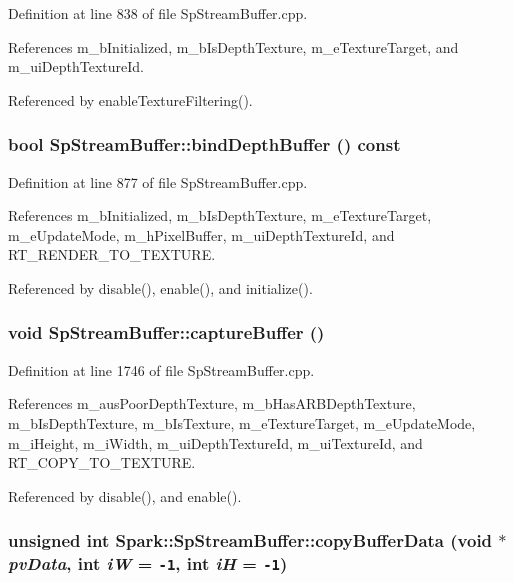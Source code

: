 Definition at line 838 of file Sp\-Stream\-Buffer.cpp.

References m\_\-b\-Initialized, m\_\-b\-Is\-Depth\-Texture, m\_\-e\-Texture\-Target, and m\_\-ui\-Depth\-Texture\-Id.

Referenced by enable\-Texture\-Filtering().
\subsubsection{\setlength{\rightskip}{0pt plus 5cm}bool Sp\-Stream\-Buffer::bind\-Depth\-Buffer () const\hspace{0.3cm}{\tt  [protected]}}\label{classSpark_1_1SpStreamBuffer_b9}


Definition at line 877 of file Sp\-Stream\-Buffer.cpp.

References m\_\-b\-Initialized, m\_\-b\-Is\-Depth\-Texture, m\_\-e\-Texture\-Target, m\_\-e\-Update\-Mode, m\_\-h\-Pixel\-Buffer, m\_\-ui\-Depth\-Texture\-Id, and RT\_\-RENDER\_\-TO\_\-TEXTURE.

Referenced by disable(), enable(), and initialize().
\subsubsection{\setlength{\rightskip}{0pt plus 5cm}void Sp\-Stream\-Buffer::capture\-Buffer ()\hspace{0.3cm}{\tt  [protected]}}\label{classSpark_1_1SpStreamBuffer_b6}


Definition at line 1746 of file Sp\-Stream\-Buffer.cpp.

References m\_\-aus\-Poor\-Depth\-Texture, m\_\-b\-Has\-ARBDepth\-Texture, m\_\-b\-Is\-Depth\-Texture, m\_\-b\-Is\-Texture, m\_\-e\-Texture\-Target, m\_\-e\-Update\-Mode, m\_\-i\-Height, m\_\-i\-Width, m\_\-ui\-Depth\-Texture\-Id, m\_\-ui\-Texture\-Id, and RT\_\-COPY\_\-TO\_\-TEXTURE.

Referenced by disable(), and enable().
\subsubsection{\setlength{\rightskip}{0pt plus 5cm}unsigned int Spark::Sp\-Stream\-Buffer::copy\-Buffer\-Data (void $\ast$ {\em pv\-Data}, int {\em i\-W} = {\tt -1}, int {\em i\-H} = {\tt -1})\hspace{0.3cm}{\tt  [inline]}}\label{classSpark_1_1SpStreamBuffer_a5}


